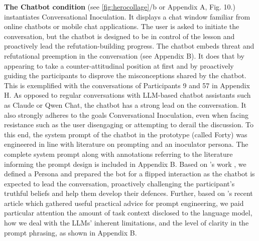 \documentclass[sigconf]{acmart}
\begin{document}
\textbf{The Chatbot condition} (see \autoref{fig:herocollage}/b or Appendix A, Fig. 10.) instantiates Conversational Inoculation. 
It displays a chat window familiar from online chatbots or mobile chat applications.
The user is asked to initiate the conversation, but the chatbot is designed to be in control of the lesson and proactively lead the refutation-building progress. 
The chatbot embeds threat and refutational preemption \cite{Banas_Rains_2010} in the conversation (see Appendix B). It does that by appearing to take a counter-attitudinal position at first and by proactively guiding the participants to disprove the misconceptions shared by the chatbot. This is exemplified with the conversations of Participants 9 and 57 in Appendix H. As opposed to regular conversations with LLM-based chatbot assistants such as Claude or Qwen Chat, the chatbot has a strong lead on the conversation. It also strongly adheres to the goals Conversational Inoculation, even when facing resistance such as the user disengaging or attempting to derail the discussion.
To this end, the system prompt of the chatbot in the prototype (called Forty) was engineered in line with literature on prompting and an inoculator persona. 
The complete system prompt along with annotations referring to the literature informing the prompt design is included in Appendix B. 
Based on \citeauthor{White_Fu_Hays_Sandborn_Olea_Gilbert_Elnashar_SpencerSmith_Schmidt_2023}'s work \cite{White_Fu_Hays_Sandborn_Olea_Gilbert_Elnashar_SpencerSmith_Schmidt_2023}, we defined a Persona and prepared the bot for a flipped interaction \cite{chen2025experience} as the chatbot is expected to lead the conversation, proactively challenging the participant's truthful beliefs and help them develop their defences. Further, based on \citeauthor{Giray_2023}'s recent article \cite{Giray_2023} which gathered useful practical advice for prompt engineering, we paid particular attention the amount of task context disclosed to the language model, how we deal with the LLMs' inherent limitations, and the level of clarity in the prompt phrasing, as shown in Appendix B. 
\end{document}
